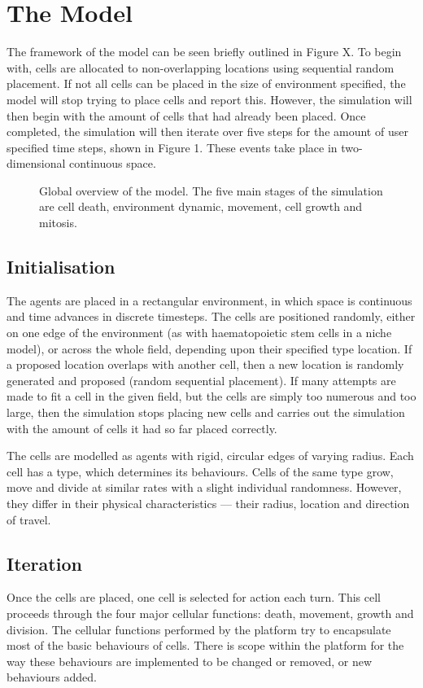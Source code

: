\documentclass[12pt]{article}
\begin{document}
\section{The Model}
The framework of the model can be seen briefly outlined in Figure X. To 
begin with, cells are allocated to non-overlapping locations using 
sequential random placement. If not all cells can be placed in the size 
of environment specified, the model will stop trying to place cells and 
report this. However, the simulation will then begin with the amount of 
cells that had already been placed. Once completed, the simulation will 
then iterate over five steps for the amount of user specified time 
steps, shown in Figure 1. These events take place in two-dimensional 
continuous space. 

\begin{figure}[H]
\centering
\caption{Global overview of the model. The five main stages 
of the simulation are cell death, environment dynamic, movement, cell 
growth and mitosis.}
\end{figure}

\subsection{Initialisation}
The agents are placed in a rectangular environment, in which space is 
continuous and time advances in discrete timesteps. The cells are 
positioned randomly, either on one edge of the environment (as with 
haematopoietic stem cells in a niche model), or across the whole field, 
depending upon their specified type location. If a proposed location 
overlaps with another cell, then a new location is randomly generated 
and proposed (random sequential placement). If many attempts are made to 
fit a cell in the given field, but the cells are simply too numerous and 
too large, then the simulation stops placing new cells and carries out 
the simulation with the amount of cells it had so far placed correctly.

The cells are modelled as agents with rigid, circular edges of varying 
radius. Each cell has a type, which determines its behaviours. Cells of 
the same type grow, move and divide at similar rates with a slight 
individual randomness. However, they differ in their physical 
characteristics --- their radius, location and direction of travel.

\subsection{Iteration}
Once the cells are placed, one cell is selected for action each turn. 
This cell proceeds through the four major cellular functions: death, 
movement, growth and division. The cellular functions performed by the 
platform try to encapsulate most of the basic behaviours of cells. There 
is scope within the platform for the way these behaviours are 
implemented to be changed or removed, or new behaviours added.
\end{document}
